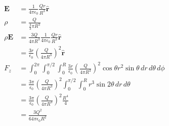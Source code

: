 \documentclass{article}
\renewcommand{\vec}[1]{\boldsymbol{\mathbf{#1}}}
\newcommand{\uvec}[1]{\hat{\vec{#1}}}
\newcommand{\ke}{\frac{1}{4 \pi \epsilon_0}}
\begin{document}
\subsection{}

\begin{align*}
  \vec{E}      & = \ke \frac{Q r}{R^3} \uvec{r}                                                                                                                               \\
  \rho         & = \frac{Q}{\frac{4}{3} \pi R^3}                                                                                                                              \\
  \rho \vec{E} & = \frac{3 Q}{4 \pi R^3} \ke \frac{Q r}{R^3} \uvec{r}                                                                                                         \\
               & = \frac{3 r}{\epsilon_0} \left( \frac{Q}{4 \pi R^3} \right)^2 \uvec{r}                                                                                       \\
  F_z          & = \int_0^{2 \pi} \int_0^{\pi / 2} \int_0^R \frac{3 r}{\epsilon_0} \left( \frac{Q}{4 \pi R^3} \right)^2 \cos \theta r^2 \sin \theta \,d r \,d \theta \,d \phi \\
               & = \frac{3 \pi}{\epsilon_0} \left( \frac{Q}{4 \pi R^3} \right)^2 \int_0^{\pi / 2} \int_0^R r^3 \sin 2 \theta \,d r \,d \theta                                 \\
               & = \frac{3 \pi}{\epsilon_0} \left( \frac{Q}{4 \pi R^3} \right)^2 \frac{R^4}{4}                                                                                \\
               & = \frac{3 Q^2}{64 \pi \epsilon_0 R^2}
\end{align*}

\setcounter{subsection}{48}
\subsection{}
\end{document}
